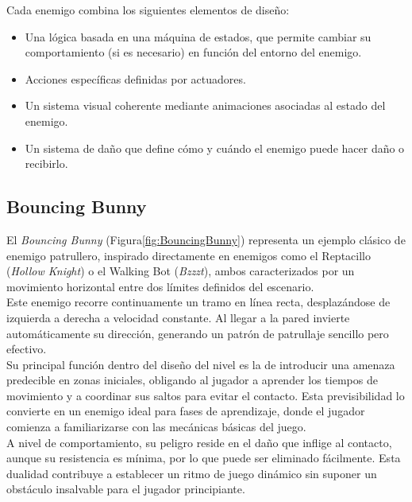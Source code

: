 Cada enemigo combina los siguientes elementos de diseño:
\begin{itemize}
    \item Una lógica basada en una máquina de estados, que permite cambiar su comportamiento (si es necesario) en función del entorno del enemigo.
    \item Acciones específicas definidas por actuadores.
    \item Un sistema visual coherente mediante animaciones asociadas al estado del enemigo.
    \item Un sistema de daño que define cómo y cuándo el enemigo puede hacer daño o recibirlo.
\end{itemize}

\subsection{Bouncing Bunny}

El \textit{Bouncing Bunny} (Figura\ref{fig:BouncingBunny}) representa un ejemplo clásico de enemigo patrullero, inspirado directamente en enemigos como el Reptacillo (\textit{Hollow Knight}) o el Walking Bot (\textit{Bzzzt}), ambos caracterizados por un movimiento horizontal entre dos límites definidos del escenario.\\

Este enemigo recorre continuamente un tramo en línea recta, desplazándose de izquierda a derecha a velocidad constante. Al llegar a la pared invierte automáticamente su dirección, generando un patrón de patrullaje sencillo pero efectivo.\\

Su principal función dentro del diseño del nivel es la de introducir una amenaza predecible en zonas iniciales, obligando al jugador a aprender los tiempos de movimiento y a coordinar sus saltos para evitar el contacto. Esta previsibilidad lo convierte en un enemigo ideal para fases de aprendizaje, donde el jugador comienza a familiarizarse con las mecánicas básicas del juego.\\

A nivel de comportamiento, su peligro reside en el daño que inflige al contacto, aunque su resistencia es mínima, por lo que puede ser eliminado fácilmente. Esta dualidad contribuye a establecer un ritmo de juego dinámico sin suponer un obstáculo insalvable para el jugador principiante.\\


